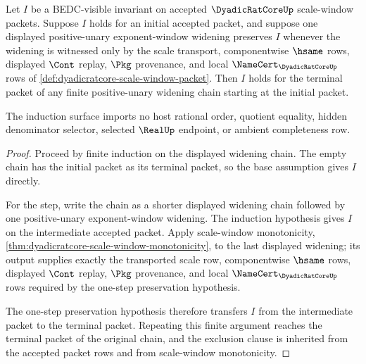 \begin{theorem}
\label{thm:dyadicratcore-finite-widening-chain-induction}
Let $I$ be a BEDC-visible invariant on accepted $\DyadicRatCoreUp$ scale-window packets. Suppose $I$ holds for an initial accepted packet, and suppose one displayed positive-unary exponent-window widening preserves $I$ whenever the widening is witnessed only by the scale transport, componentwise $\hsame$ rows, displayed $\Cont$ replay, $\Pkg$ provenance, and local $\NameCert_{\DyadicRatCoreUp}$ rows of \autoref{def:dyadicratcore-scale-window-packet}. Then $I$ holds for the terminal packet of any finite positive-unary widening chain starting at the initial packet.

The induction surface imports no host rational order, quotient equality, hidden denominator selector, selected $\RealUp$ endpoint, or ambient completeness row.
\end{theorem}
\begin{proof}
Proceed by finite induction on the displayed widening chain. The empty chain has the initial packet as its terminal packet, so the base assumption gives $I$ directly.

For the step, write the chain as a shorter displayed widening chain followed by one positive-unary exponent-window widening. The induction hypothesis gives $I$ on the intermediate accepted packet. Apply scale-window monotonicity, \autoref{thm:dyadicratcore-scale-window-monotonicity}, to the last displayed widening; its output supplies exactly the transported scale row, componentwise $\hsame$ rows, displayed $\Cont$ replay, $\Pkg$ provenance, and local $\NameCert_{\DyadicRatCoreUp}$ rows required by the one-step preservation hypothesis.

The one-step preservation hypothesis therefore transfers $I$ from the intermediate packet to the terminal packet. Repeating this finite argument reaches the terminal packet of the original chain, and the exclusion clause is inherited from the accepted packet rows and from scale-window monotonicity.
\end{proof}

